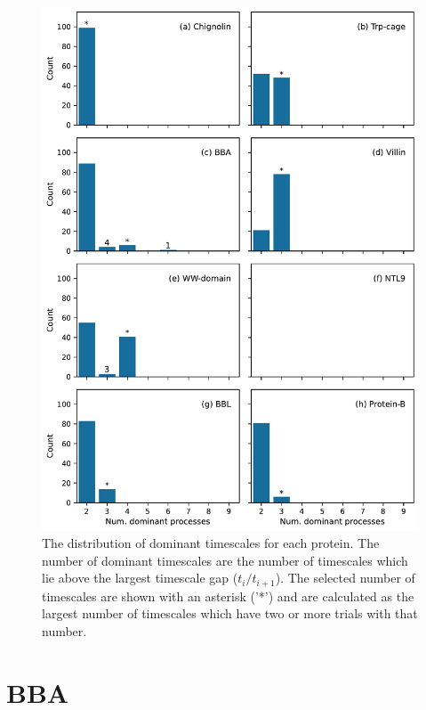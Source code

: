 \documentclass{article}
\begin{document}
\begin{figure}
    \centering
    \includegraphics[height=0.8\textheight]{figures/num_dominant_processes_count.pdf}
    \caption{The distribution of dominant timescales for each protein.  The number of dominant timescales are the number of timescales which lie above the largest timescale gap ($t_{i}/t_{i+1}$). The selected number of timescales are shown with an asterisk ('*') and are calculated as the largest number of timescales which have two or more trials with that number.}
    \label{fig:num_proc_all}
\end{figure}

\section{BBA}
\end{document}
